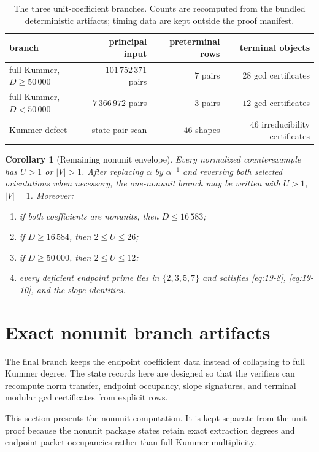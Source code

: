 \documentclass[11pt]{article}
\numberwithin{equation}{section}
\newtheorem{corollary}[theorem]{Corollary}
\theoremstyle{definition}
\begin{document}
\begin{table}[ht]
\centering
\begin{tabular}{lrrr}
\hline
branch & principal input & preterminal rows & terminal objects\\
\hline
full Kummer, \(D\geq50\,000\) & \(101\,752\,371\) pairs & \(7\) pairs & \(28\) gcd certificates\\
full Kummer, \(D<50\,000\) & \(7\,366\,972\) pairs & \(3\) pairs & \(12\) gcd certificates\\
Kummer defect & state-pair scan & \(46\) shapes & \(46\) irreducibility certificates\\
\hline
\end{tabular}
\caption{The three unit-coefficient branches.  Counts are recomputed from the
bundled deterministic artifacts; timing data are kept outside the proof
manifest.}
\end{table}

\begin{corollary}[Remaining nonunit envelope]\label{cor:remainingnonunit}
Every normalized counterexample has \(U>1\) or \(|V|>1\).  After replacing
\(\alpha\) by \(\alpha^{-1}\) and reversing both selected orientations when
necessary, the one-nonunit branch may be written with \(U>1\), \(|V|=1\).
Moreover:
\begin{enumerate}[label=(\roman*)]
\item if both coefficients are nonunits, then \(D\leq16\,583\);
\item if \(D\geq16\,584\), then \(2\leq U\leq26\);
\item if \(D\geq50\,000\), then \(2\leq U\leq12\);
\item every deficient endpoint prime lies in \(\{2,3,5,7\}\) and satisfies
\eqref{eq:19-8}, \eqref{eq:19-10}, and the slope identities.
\end{enumerate}
\end{corollary}


\section{Exact nonunit branch artifacts}
\label{sec:nonunitcomputation}

The final branch keeps the endpoint coefficient data instead of collapsing to full Kummer degree.  The state records here are designed so that the verifiers can recompute norm transfer, endpoint occupancy, slope signatures, and terminal modular gcd certificates from explicit rows.

This section presents the nonunit computation.  It is kept
separate from the unit proof because the nonunit package states retain exact
extraction degrees and endpoint packet occupancies rather than full Kummer
multiplicity.
\end{document}
